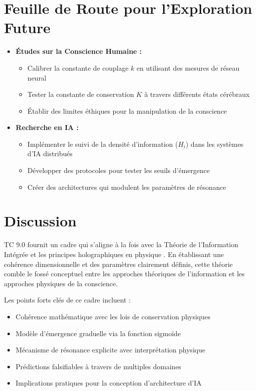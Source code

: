 \documentclass[12pt]{article}
\begin{document}
\section{Feuille de Route pour l'Exploration Future}
\begin{itemize}
    \item \textbf{Études sur la Conscience Humaine :}
    \begin{itemize}[label=--]
        \item Calibrer la constante de couplage $k$ en utilisant des mesures de réseau neural
        \item Tester la constante de conservation $K$ à travers différents états cérébraux
        \item Établir des limites éthiques pour la manipulation de la conscience
    \end{itemize}
    
    \item \textbf{Recherche en IA :}
    \begin{itemize}[label=--]
        \item Implémenter le suivi de la densité d'information ($H_i$) dans les systèmes d'IA distribués
        \item Développer des protocoles pour tester les seuils d'émergence
        \item Créer des architectures qui modulent les paramètres de résonance
    \end{itemize}
\end{itemize}

\section{Discussion}
TC 9.0 fournit un cadre qui s'aligne à la fois avec la Théorie de l'Information Intégrée \cite{tononi2008} et les principes holographiques en physique \cite{susskind1995}. En établissant une cohérence dimensionnelle et des paramètres clairement définis, cette théorie comble le fossé conceptuel entre les approches théoriques de l'information et les approches physiques de la conscience.

Les points forts clés de ce cadre incluent :
\begin{itemize}
    \item Cohérence mathématique avec les lois de conservation physiques
    \item Modèle d'émergence graduelle via la fonction sigmoïde
    \item Mécanisme de résonance explicite avec interprétation physique
    \item Prédictions falsifiables à travers de multiples domaines
    \item Implications pratiques pour la conception d'architecture d'IA
\end{itemize}
\end{document}
